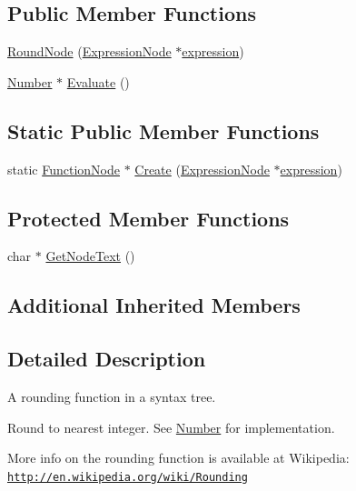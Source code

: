 \subsection*{Public Member Functions}
\begin{DoxyCompactItemize}
\item 
\hyperlink{classRoundNode_a4f9524cf769e2c45f2556dd7455eb852}{Round\+Node} (\hyperlink{classExpressionNode}{Expression\+Node} $\ast$\hyperlink{classFunctionNode_ad7577b179a1937aaf8a0058bb5b546dc}{expression})
\item 
\hyperlink{structNumber}{Number} $\ast$ \hyperlink{classRoundNode_a128e5cfa1f3829cacb373f6740c7f193}{Evaluate} ()
\end{DoxyCompactItemize}
\subsection*{Static Public Member Functions}
\begin{DoxyCompactItemize}
\item 
static \hyperlink{classFunctionNode}{Function\+Node} $\ast$ \hyperlink{classRoundNode_a4f767ae60f5ec52d1750a3f5a35be246}{Create} (\hyperlink{classExpressionNode}{Expression\+Node} $\ast$\hyperlink{classFunctionNode_ad7577b179a1937aaf8a0058bb5b546dc}{expression})
\end{DoxyCompactItemize}
\subsection*{Protected Member Functions}
\begin{DoxyCompactItemize}
\item 
char $\ast$ \hyperlink{classRoundNode_a8045a1a8d7e229a2aface954950f52da}{Get\+Node\+Text} ()
\end{DoxyCompactItemize}
\subsection*{Additional Inherited Members}


\subsection{Detailed Description}
A rounding function in a syntax tree. 

Round to nearest integer. See \hyperlink{structNumber}{Number} for implementation.

More info on the rounding function is available at Wikipedia\+: \href{http://en.wikipedia.org/wiki/Rounding}{\tt http\+://en.\+wikipedia.\+org/wiki/\+Rounding} 

